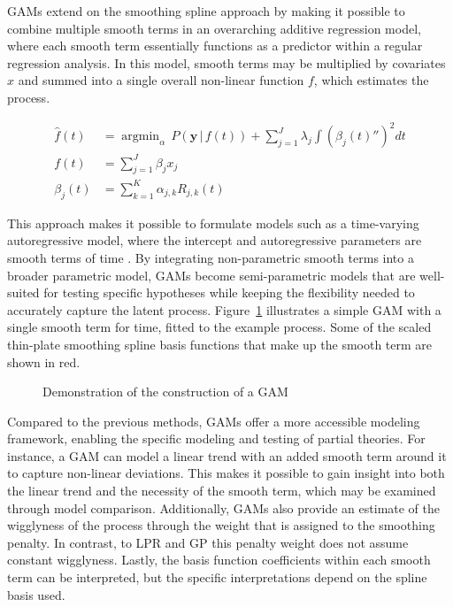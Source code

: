 \documentclass[jou, floatsintext]{apa7}
\DeclareMathOperator*{\argmin}{argmin}
\begin{document}
GAMs extend on the smoothing spline approach by making it possible to combine
multiple smooth terms in an overarching additive regression model, where each
smooth term essentially functions as a predictor within a regular regression
analysis. In this model, smooth terms may be multiplied by covariates $x$ and
summed into a single overall non-linear function $f$, which estimates the
process.

\begin{equation}
  \begin{aligned}
    \hat{f}(t) & = \argmin_\alpha \, P(\textbf{y} \, | \, f(t)) +
    \sum_{j = 1}^{J} \lambda_j \int {(\beta_j(t)'')}^2 dt         \\
    f(t)       & = \sum_{j = 1}^{J} \beta_j x_j                   \\
    \beta_j(t) & = \sum^K_{k = 1} \alpha_{j,k} R_{j, k}(t)
  \end{aligned}
\end{equation}

\noindent This approach makes it possible to formulate models such
as a time-varying autoregressive model, where the intercept and autoregressive
parameters are smooth terms of time \parencite{bringmann_changing_2017,
  bringmann_modeling_2015}. By integrating non-parametric smooth terms into a
broader parametric model, GAMs become semi-parametric models that are
well-suited for testing specific hypotheses while keeping the flexibility
needed to accurately capture the latent process. Figure~\ref{fig:gam_dem}
illustrates a simple GAM with a single smooth term for time, fitted to the
example process. Some of the scaled thin-plate smoothing spline basis functions
that make up the smooth term are shown in red.

\begin{figure}[!ht]
  \caption{Demonstration of the construction of a GAM}
  \label{fig:gam_dem}
\end{figure}

Compared to the previous methods, GAMs offer a more accessible modeling
framework, enabling the specific modeling and testing of partial theories. For
instance, a GAM can model a linear trend with an added smooth term around it to
capture non-linear deviations. This makes it possible to gain insight into both
the linear trend and the necessity of the smooth term, which may be examined
through model comparison. Additionally, GAMs also provide an estimate of the
wigglyness of the process through the weight that is assigned to the smoothing
penalty. In contrast, to LPR and GP this penalty weight does not assume
constant wigglyness. Lastly, the basis function coefficients within each smooth
term can be interpreted, but the specific interpretations depend on the spline
basis used.
\end{document}
